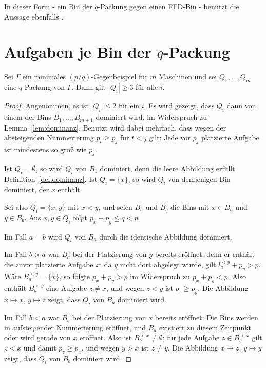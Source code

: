 In dieser Form - ein Bin der $q$-Packung gegen einen FFD-Bin - benutzt \textcite{cao1995}
die Aussage ebenfalls \cite[S.~88]{cao1995}.

\section{Aufgaben je Bin der \texorpdfstring{$q$}{q}-Packung}
\label{sec:drei-aufgaben}

\begin{lemma}
\label{lem:drei-aufgaben}
Sei $\Gamma$ ein minimales $(p/q)$-Gegen\-bei\-spiel für $m$ Maschinen und sei
$Q_1, \ldots, Q_m$ eine $q$-Packung von $\Gamma$.
Dann gilt $|Q_i| \ge 3$ für alle $i$.
\end{lemma}

\begin{proof}
Angenommen, es ist $|Q_i| \le 2$ für ein $i$.
Es wird gezeigt, dass $Q_i$ dann von einem der Bins $B_1, \ldots, B_{m+1}$ dominiert wird, im
Widerspruch zu Lemma~\ref{lem:dominanz}.
Benutzt wird dabei mehrfach, dass wegen der absteigenden Nummerierung $p_t \ge p_j$ für $t < j$
gilt: Jede vor $p_j$ platzierte Aufgabe ist mindestens so groß wie $p_j$.

Ist $Q_i = \emptyset$, so wird $Q_i$ von $B_1$ dominiert, denn die leere Abbildung erfüllt
Definition~\ref{def:dominanz}.
Ist $Q_i = \{x\}$, so wird $Q_i$ von demjenigen Bin dominiert, der $x$ enthält.

Sei also $Q_i = \{x, y\}$ mit $x < y$, und seien $B_a$ und $B_b$ die Bins mit $x \in B_a$ und
$y \in B_b$.
Aus $x, y \in Q_i$ folgt $p_x + p_y \le q < p$.

Im Fall $a = b$ wird $Q_i$ von $B_a$ durch die identische Abbildung dominiert.

Im Fall $b > a$ war $B_a$ bei der Platzierung von $y$ bereits eröffnet, denn er enthält die
zuvor platzierte Aufgabe $x$; da $y$ nicht dort abgelegt wurde, gilt $l_a^{<y} + p_y > p$.
Wäre $B_a^{<y} = \{x\}$, so folgte $p_x + p_y > p$ im Widerspruch zu $p_x + p_y < p$.
Also enthält $B_a^{<y}$ eine Aufgabe $z \ne x$, und wegen $z < y$ ist $p_z \ge p_y$.
Die Abbildung $x \mapsto x$, $y \mapsto z$ zeigt, dass $Q_i$ von $B_a$ dominiert wird.

Im Fall $b < a$ war $B_b$ bei der Platzierung von $x$ bereits eröffnet: Die Bins werden in
aufsteigender Nummerierung eröffnet, und $B_a$ existiert zu diesem Zeitpunkt oder wird gerade
von $x$ eröffnet.
Also ist $B_b^{<x} \ne \emptyset$; für jede Aufgabe $z \in B_b^{<x}$ gilt $z < x$ und damit
$p_z \ge p_x$, und wegen $y > x$ ist $z \ne y$.
Die Abbildung $x \mapsto z$, $y \mapsto y$ zeigt, dass $Q_i$ von $B_b$ dominiert wird.
\end{proof}

